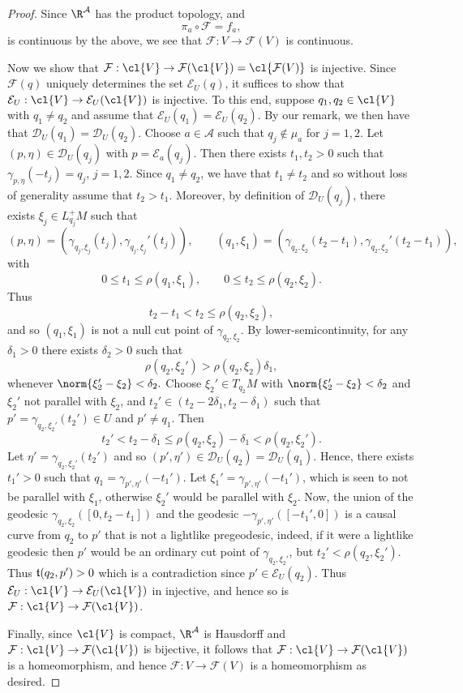 \begin{proof}
Since $\R^\mathcal{A}$ has the product topology, and
$$\pi_a\circ\mathcal{F}=f_a,$$
is continuous by the above, we see that $\mathcal{F}:V\to\mathcal{F}(V)$ is continuous.

Now we show that $\mathcal{F}:\cl{V}\to\mathcal{F}(\cl{V})=\cl{\mathcal{F}(V)}$ is injective.  Since $\mathcal{F}(q)$ uniquely determines the set $\mathcal{E}_U(q)$, it suffices to show that $\mathcal{E}_U:\cl{V}\to\mathcal{E}_U(\cl{V})$ is injective.  To this end, suppose $q_1,q_2\in\cl{V}$ with $q_1\neq q_2$ and assume that $\mathcal{E}_U(q_1)=\mathcal{E}_U(q_2)$.  By our remark, we then have that $\mathcal{D}_U(q_1)=\mathcal{D}_U(q_2)$.  Choose $a\in\mathcal{A}$ such that $q_j\notin\mu_a$ for $j=1,2$.  Let $(p,\eta)\in\mathcal{D}_U(q_j)$ with $p=\mathcal{E}_a(q_j)$.  Then there exists $t_1,t_2>0$ such that $\gamma_{p,\eta}(-t_j)=q_j$, $j=1,2$.  Since $q_1\neq q_2$, we have that $t_1\neq t_2$ and so without loss of generality assume that $t_2>t_1$.  Moreover, by definition of $\mathcal{D}_U(q_j)$, there exists $\xi_j\in L_{q_j}^+M$ such that
$$(p,\eta)=(\gamma_{q_j,\xi_j}(t_j),\gamma_{q_j,\xi_j}'(t_j)),\qquad (q_1,\xi_1)=(\gamma_{q_2,\xi_2}(t_2-t_1),\gamma_{q_2,\xi_2}'(t_2-t_1)),$$
with
$$0\leq t_1\leq\rho(q_1,\xi_1),\qquad 0\leq t_2\leq\rho(q_2,\xi_2).$$
Thus
$$t_2-t_1<t_2\leq \rho(q_2,\xi_2),$$
and so $(q_1,\xi_1)$ is not a null cut point of $\gamma_{q_2,\xi_2}$.  By lower-semicontinuity, for any $\delta_1>0$ there exists $\delta_2>0$ such that
$$\rho(q_2,\xi_2')>\rho(q_2,\xi_2)\delta_1,$$
whenever $\norm{\xi_2'-\xi_2}<\delta_2.$  Choose $\xi_2'\in T_{q_2}M$ with $\norm{\xi_2'-\xi_2}<\delta_2$ and $\xi_2'$ not parallel with $\xi_2$, and $t_2'\in(t_2-2\delta_1,t_2-\delta_1)$ such that $p'=\gamma_{q_2,\xi_2'}(t_2')\in U$ and $p'\neq q_1$.  Then
$$t_2'<t_2-\delta_1\leq\rho(q_2,\xi_2)-\delta_1<\rho(q_2,\xi_2').$$
Let $\eta'=\gamma_{q_2,\xi_2'}(t_2')$ and so $(p',\eta')\in\mathcal{D}_U(q_2)=\mathcal{D}_U(q_1)$.  Hence, there exists $t_1'>0$ such that $q_1=\gamma_{p',\eta'}(-t_1')$.  Let $\xi_1'=\gamma_{p',\eta'}(-t_1')$, which is seen to not be parallel with $\xi_1$, otherwise $\xi_2'$ would be parallel with $\xi_2$.  Now, the union of the geodesic $\gamma_{q_2,\xi_2}([0,t_2-t_1])$ and the geodesic $-\gamma_{p',\eta'}([-t_1',0])$ is a causal curve from $q_2$ to $p'$ that is not a lightlike pregeodesic, indeed, if it were a lightlike geodesic then $p'$ would be an ordinary cut point of $\gamma_{q_2,\xi_2'}$, but $t_2'<\rho(q_2,\xi_2')$.  Thus $\frak{t}(q_2,p')>0$ which is a contradiction since $p'\in\mathcal{E}_U(q_2)$.  Thus $\mathcal{E}_U:\cl{V}\to\mathcal{E}_U(\cl{V})$ in injective, and hence so is $\mathcal{F}:\cl{V}\to\mathcal{F}(\cl{V})$.

Finally, since $\cl{V}$ is compact, $\R^\mathcal{A}$ is Hausdorff and $\mathcal{F}:\cl{V}\to\mathcal{F}(\cl{V})$ is bijective, it follows that $\mathcal{F}:\cl{V}\to\mathcal{F}(\cl{V})$ is a homeomorphism, and hence $\mathcal{F}:V\to\mathcal{F}(V)$ is a homeomorphism as desired.

\end{proof}



